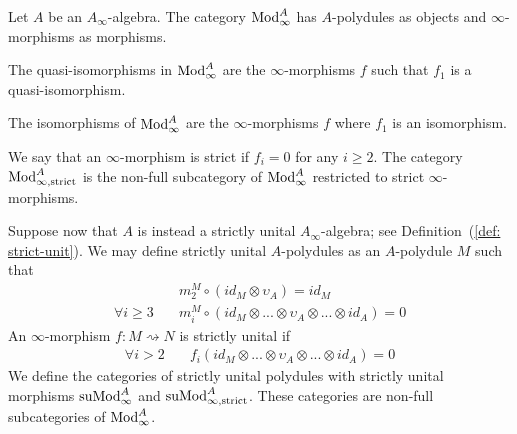 \documentclass[../thesis.tex]{subfiles}
\begin{document}
            \begin{definition}
                Let $A$ be an $A_\infty$-algebra. The category $\tt{Mod}_\infty^A$ has $A$-polydules as objects and $\infty$-morphisms as morphisms.

            \end{definition}

            The quasi-isomorphisms in $\tt{Mod}_\infty^A$ are the $\infty$-morphisms $f$ such that $f_1$ is a quasi-isomorphism.

            \begin{remark}
                The isomorphisms of $\tt{Mod}_\infty^A$ are the $\infty$-morphisms $f$ where $f_1$ is an isomorphism.
            \end{remark}

            We say that an $\infty$-morphism is strict if $f_i = 0$ for any $i\geq 2$. The category $\tt{Mod}_{\infty, \tt{strict}}^A$ is the non-full subcategory of $\tt{Mod}_\infty^A$ restricted to strict $\infty$-morphisms.

            Suppose now that $A$ is instead a strictly unital $A_\infty$-algebra; see Definition~(\ref{def: strict-unit}). We may define strictly unital $A$-polydules as an $A$-polydule $M$ such that
            \begin{align*}
                & m^M_2\circ (id_M \otimes \upsilon_A) = id_M \\
                \forall i\geq 3\quad & m^M_i\circ (id_M \otimes ... \otimes \upsilon_A \otimes ... \otimes id_A) = 0
            \end{align*}
            An $\infty$-morphism $f : M \rightsquigarrow N$ is strictly unital if
            \begin{align*}
                \forall i> 2 \quad & f_i(id_M \otimes ... \otimes \upsilon_A \otimes ... \otimes id_A) = 0 
            \end{align*}
            We define the categories of strictly unital polydules with strictly unital morphisms $\tt{suMod}_\infty^A$ and $\tt{suMod}_{\infty, \tt{strict}}^A$. These categories are non-full subcategories of $\tt{Mod}_\infty^A$.
\end{document}
